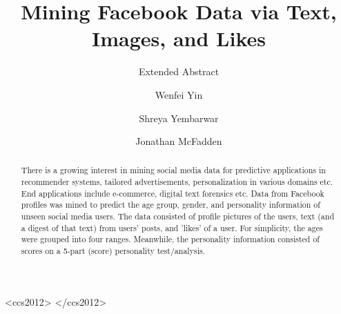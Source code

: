 \documentclass[sigconf]{acmart}
\begin{document}
\title{Mining Facebook Data via Text, Images, and Likes}
\subtitle{Extended Abstract}


\author{Wenfei Yin}
\authornote{}
\orcid{}

\author{Shreya Yembarwar}
\authornote{}
\orcid{}

\author{Jonathan McFadden}
\authornote{}
\orcid{}



\renewcommand{\shortauthors}{Wenfei Yin, Shreya Yembarwar, Jonathan McFadden}


\begin{abstract}
There is a growing interest in mining social media data for predictive applications in recommender systems, tailored advertisements, personalization in various domains etc. End applications include e-commerce, digital text forensics etc. Data from Facebook profiles was mined to predict the age group, gender, and personality information of unseen social media users.  The data consisted of profile pictures of the users, text (and a digest of that text) from users' posts, and 'likes' of a user.  For simplicity, the ages were grouped into four ranges.  Meanwhile, the personality information consisted of scores on a 5-part (score) personality
test/analysis.
\end{abstract}

%
%
\begin{CCSXML}
<ccs2012>
</ccs2012>  
\end{CCSXML}
\end{document}
